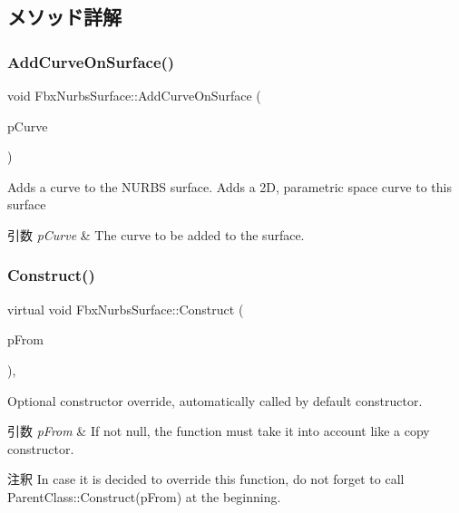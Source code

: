 \subsection{メソッド詳解}
\mbox{\label{class_fbx_nurbs_surface_a4e10c230bce83672fa38c0cb168f2aa6}} 
\subsubsection{\texorpdfstring{Add\+Curve\+On\+Surface()}{AddCurveOnSurface()}}
{\footnotesize\ttfamily void Fbx\+Nurbs\+Surface\+::\+Add\+Curve\+On\+Surface (\begin{DoxyParamCaption}\item[{\hyperlink{class_fbx_node}{Fbx\+Node} $\ast$}]{p\+Curve }\end{DoxyParamCaption})}

Adds a curve to the N\+U\+R\+BS surface. Adds a 2D, parametric space curve to this surface 
\begin{DoxyParams}{引数}
{\em p\+Curve} & The curve to be added to the surface. \\
\hline
\end{DoxyParams}
\mbox{\label{class_fbx_nurbs_surface_a3487d194007af1729d31dc9dfa0b12c9}} 
\subsubsection{\texorpdfstring{Construct()}{Construct()}}
{\footnotesize\ttfamily virtual void Fbx\+Nurbs\+Surface\+::\+Construct (\begin{DoxyParamCaption}\item[{const \hyperlink{class_fbx_object}{Fbx\+Object} $\ast$}]{p\+From }\end{DoxyParamCaption})\hspace{0.3cm}{\ttfamily [protected]}, {\ttfamily [virtual]}}

Optional constructor override, automatically called by default constructor. 
\begin{DoxyParams}{引数}
{\em p\+From} & If not null, the function must take it into account like a copy constructor. \\
\hline
\end{DoxyParams}
\begin{DoxyRemark}{注釈}
In case it is decided to override this function, do not forget to call Parent\+Class\+::\+Construct(p\+From) at the beginning. 
\end{DoxyRemark}


